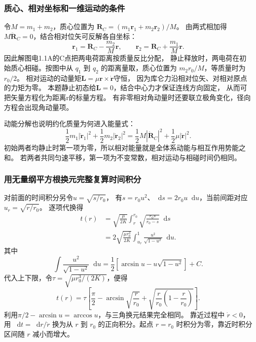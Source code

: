 \documentclass[UTF8,fontset=fandol,a4paper,11pt]{ctexart}
\newcommand{\dd}{\mathop{}\!\mathrm{d}}
\newcommand{\vect}[1]{\bm{#1}}
\begin{document}
\subsubsection*{质心、相对坐标和一维运动的条件}
令$M=m_1+m_2$，质心位置为
$\vect R_C=(m_1\vect r_1+m_2\vect r_2)/M$。
由两式相加得$M\ddot{\vect R}_C=0$，结合相对位矢可反解各自坐标：
\[
\vect r_1=\vect R_C-\frac{m_2}M\vect r,\qquad
\vect r_2=\vect R_C+\frac{m_1}M\vect r.
\]
因此解图电1.1A的C点把两电荷距离按质量反比分配，
静止释放时，两电荷在初始质心相碰。按图中从 $q_1$ 到 $q_2$ 的距离量取，质心位置为 $m_2r_0/M$，等质量时为 $r_0/2$。
相对运动的动量矩$\vect L=\mu\vect r\times\dot{\vect r}$守恒，
因为库仑力沿相对位矢、对相对原点的力矩为零。
本题静止初态给$\vect L=0$，结合中心力才保证连线方向固定，
从而可把矢量方程化为距离r的标量方程。
有非零相对角动量时还要联立极角变化，径向方程会出现角动量项。

动能分解也说明约化质量为何进入能量式：
\[
\frac12m_1|\dot{\vect r}_1|^2+\frac12m_2|\dot{\vect r}_2|^2
=\frac12M|\dot{\vect R}_C|^2+\frac12\mu|\dot{\vect r}|^2.
\]
初始两者均静止时第一项为零，所以相对能量就是全体系动能与相互作用势能之和。
若两者共同匀速平移，第一项为不变常数，相对运动与相碰时间仍相同。

\subsubsection*{用无量纲平方根换元完整复算时间积分}
对前面的时间积分另令$u=\sqrt{s/r_0}$，
有$s=r_0u^2$、$\dd s=2r_0u\dd u$，当前间距对应$u_r=\sqrt{r/r_0}$。
逐项代换得
\[
\begin{aligned}
t(r)&=\sqrt{\frac\mu{2K}}\int_r^{r_0}\sqrt{\frac{r_0s}{r_0-s}}\dd s\\
&=2\sqrt{\frac{\mu r_0^3}{2K}}\int_{u_r}^{1}\frac{u^2}{\sqrt{1-u^2}}\dd u.
\end{aligned}
\]
其中
\[
\int\frac{u^2}{\sqrt{1-u^2}}\dd u
=\frac12\left[\arcsin u-u\sqrt{1-u^2}\right]+C.
\]
代入上下限，令$\tau=\sqrt{\mu r_0^3/(2K)}$，便得
\[
t(r)=\tau\left[\frac\pi2-\arcsin\sqrt{\frac r{r_0}}
+\sqrt{\frac r{r_0}\left(1-\frac r{r_0}\right)}\right].
\]
利用$\pi/2-\arcsin u=\arccos u$，与三角换元结果完全相同。
靠近过程中 $\dot r<0$，用 $\dd t=\dd r/\dot r$ 换为从 $r$ 到 $r_0$ 的正向积分。起点 $r=r_0$ 时积分为零，靠近时积分区间随 $r$ 减小而增大。
\end{document}
